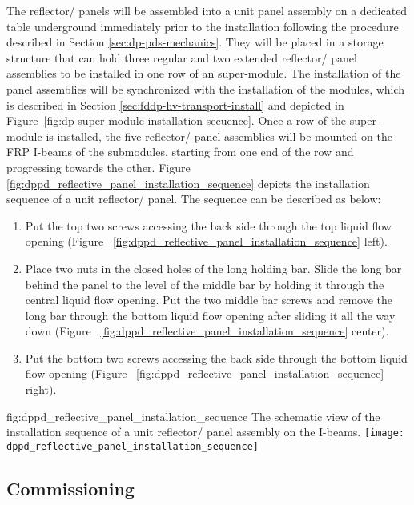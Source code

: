The reflector/ panels will be assembled into a unit panel assembly on a dedicated table underground immediately prior to the installation following the procedure described in Section \ref{sec:dp-pds-mechanics}. They will be placed in a storage structure that can hold three regular and two extended reflector/ panel assemblies to be installed in one row of an  super-module. The installation of the panel assemblies will be synchronized with the installation of the  modules, which is described in Section \ref{sec:fddp-hv-transport-install} and depicted in Figure~\ref{fig:dp-super-module-installation-secuence}. Once a row of the  super-module is installed, the five reflector/ panel assemblies will be mounted on the FRP I-beams of the  submodules, starting from one end of the row and progressing towards the other. Figure \ref{fig:dppd_reflective_panel_installation_sequence} depicts the installation sequence of a unit reflector/ panel. The sequence can be described as below:

\begin{enumerate}
\item Put the top two screws accessing the back side through the top liquid flow opening (Figure~ \ref{fig:dppd_reflective_panel_installation_sequence}  left).
\item Place two nuts in the closed holes of the long holding bar. Slide the long bar behind the panel to the level of the middle bar by holding it through the central liquid flow opening. Put the two middle bar screws and remove the long bar through the bottom liquid flow opening after sliding it all the way down (Figure~ \ref{fig:dppd_reflective_panel_installation_sequence}  center).
\item Put the bottom two screws accessing the back side through the bottom liquid flow opening (Figure~ \ref{fig:dppd_reflective_panel_installation_sequence}  right).
\end{enumerate}

\begin{dunefigure}{fig:dppd_reflective_panel_installation_sequence}
{The schematic view of the installation sequence of a unit reflector/ panel assembly on the  I-beams.}
\texttt{[image: dppd\_reflective\_panel\_installation\_sequence]}
\end{dunefigure}

\subsection{Commissioning}
\label{subsec:dp-pds-commissioning}

